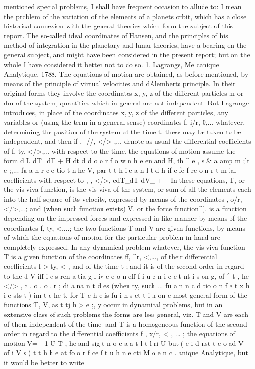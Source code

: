 \documentclass[12pt,a4paper]{article}
\theoremstyle{definition}
\begin{document}
mentioned special problems, I shall have frequent occasion to allude to: I mean the
problem of the variation of the elements of a planets orbit, which has a close historical
connexion with the general theories which form the subject of this report. The so-called
ideal coordinates of Hansen, and the principles of his method of integration in the
planetary and lunar theories, have a bearing on the general subject, and might have
been considered in the present report; but on the whole I have considered it better
not to do so.
1. Lagrange, Me canique Analytique, 1788. The equations of motion are obtained,
as before mentioned, by means of the principle of virtual velocities and dAlemberts
principle. In their original forms they involve the coordinates x, y, z of the different
particles m or dm of the system, quantities which in general are not independent.
But Lagrange introduces, in place of the coordinates x, y, z of the different particles,
any variables or (using the term in a general sense) coordinates f, i/r, 0,... whatever,
determining the position of the system at the time t: these may be taken to be
independent, and then if , -//, </> ,... denote as usual the differential coefficients of
f, ty, </>,... with respect to the time, the equations of motion assume the form
d L dT_dT + H
dt d d
o o r f o w n h e en and H, th ^ e , s & a amp m ;lt e ;,... fu a n r c e tio t n he V, par t t h i e a n l t d h if e fe f re o n r t m ial coefficients with respect to , \jr, </>,
cdT_dT dV_
+ ~
In these equations, T, or the vis viva function, is the vis viva of the system, or sum
of all the elements each into the half square of its velocity, expressed by means of
the coordinates , o/r, </>,...; and (when such function exists) V, or the force function^),
is a function depending on the impressed forces and expressed in like manner by
means of the coordinates f, ty, <,...; the two functions T and V are given functions,
by means of which the equations of motion for the particular problem in hand are
completely expressed. In any dynamical problem whatever, the vis viva function T is
a given function of the coordinates ff, ^r, <,..., of their differential coefficients
f > ty, < , and of the time t ; and it is of the second order in regard to the
d V iff i e s ren a tia g l iv c e o n eff f i u c n i c e t nt i s on g, of ^ t , he </> , c . o . o . r ; di a na n t d es (when ty, such ... fu a n n c d tio o n f e t x h i e sts t ) im t e he t. for T c h e is fu i n s ct t i h on e
most general form of the functions T, V, as t tj h > e ;, y occur in dynamical problems, but
in an extensive class of such problems the forms are less general, viz. T and V are
each of them independent of the time, and T is a homogeneous function of the second
order in regard to the differential coefficients f , x/r, < , ... ; the equations of motion
V= - 1 U T , he and sig t n o c a a t l t l ri U but ( e i d nst t e o ad V of i V s ) t t h h e at fo o r f ce f t u h n e cti M o e n c . anique Analytique, but it would be better to write
\end{document}

